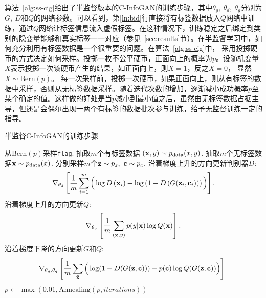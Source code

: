算法~\ref{alg:ss-cig}给出了半监督版本的C-InfoGAN的训练步骤，其中$\theta_g, ~\theta_d, ~\theta_g$分别为$G, ~D$和$Q$的网络参数。可以看到，第\ref{ln:bid}行直接将有标签数据放入$Q$网络中训练，通过$Q$网络让标签信息流入虚假标签。在这种情况下，训练稳定之后绑定到类别的隐变量能够和真实标签一一对应（参见~\ref{sec:results}节）。在半监督学习中，如何充分利用有标签数据是一个很重要的问题。在算法~\ref{alg:ss-cig}中，
采用投掷硬币的方式决定如何采样。投掷一枚不公平硬币，正面向上的概率为$p$。设随机变量$X$表示投掷一次该硬币产生的结果，如正面向上，则$X=1$，反之$X=0$，
显然$X\sim\text{Bern}(p)$。
每一次采样前，投掷一次硬币，如果正面向上，则从有标签的数据中采样，否则从无标签数据采样。随着迭代次数的增加，逐渐减小成功概率$p$至某个确定的值。这样做的好处是当$p$减小到最小值之后，虽然由无标签数据占据主导，但还是会偶尔出现一两个有标签的数据批次参与训练，给予无监督训练一定的指导。
\begin{algorithm}[htbp]
  \small
  \caption{半监督C-InfoGAN的训练步骤}
  \label{alg:ss-cig}
  \begin{algorithmic}[1]
      \State 从$\text{Bern}(p)$采样\texttt{flag}.
        \State 抽取$m$个有标签数据 
               $(\mathbf{x}, y) \sim p_{\text{data}}(x,y)$.
      \Else
        \State 抽取$m$个无标签数据$\mathbf{x} \sim p_{\text{data}}(x)$.
      \EndIf
      \State 分别采样$m$个$\mathbf{z}\sim p_z, ~\mathbf{c}\sim p_c$.
      \State 沿着梯度上升的方向更新判别器$D$:
      \[
        \nabla_{\theta_d} \left[ 
          \frac{1}{m} \sum_{i=1}^m \Big( 
            \log D\left(\mathbf{x}_i\right) + 
            \log\left( 1 - D\left( G(\mathbf{z}_i, \mathbf{c}_i) \right) \right)
          \Big)
        \right].
      \]
        \State 沿着梯度上升的方向更新$Q$: \label{ln:bid}
        \[
          \nabla_{\theta_q} \left[ 
            \frac{1}{m} \sum_{(\mathbf{x}, y)} p(y|\mathbf{x}) \log Q(\bf{x}) 
          \right].
        \]
      \EndIf
      \State 沿着梯度下降的方向更新$G$和$Q$:
      \[
        \nabla_{\theta_g,\theta_q} \left[ 
          \frac{1}{m} \sum_{\tilde{\mathbf{x}}} \Big(
            \log(1 - D(G(\mathbf{z},\mathbf{c}))) -
            p(\mathbf{c})\log Q(G(\mathbf{z}, \mathbf{c}))
          \Big)
        \right]. \label{ln:test}
      \]
      \State $p \gets \max(0.01, \text{Annealing}(p, iterations))$ 
    \EndFor
  \end{algorithmic}
\end{algorithm}

